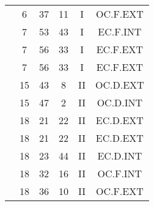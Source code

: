 \documentclass[12pt, a4paper]{article}
\begin{document}
\begin{multicols}{3}
{\begin{tabular}{c c c c c c}
	 	 	 	 & 6 & 37 & 11 & I & OC.F.EXT\\%
	 	 	 	 & 7 & 53 & 43 & I & EC.F.INT\\%
	 	 	 	 & 7 & 56 & 33 & I & EC.F.EXT\\%
	 	 	 	 & 7 & 56 & 33 & I & EC.F.EXT\\%
	 	 	 	 & 15 & 43 & 8 & II & OC.D.EXT\\%
	 	 	 	 & 15 & 47 & 2 & II & OC.D.INT\\%
	 	 	 	 & 18 & 21 & 22 & II & EC.D.EXT\\%
	 	 	 	 & 18 & 21 & 22 & II & EC.D.EXT\\%
	 	 	 	 & 18 & 23 & 44 & II & EC.D.INT\\%
	 	 	 	 & 18 & 32 & 16 & II & OC.F.INT\\%
	 	 	 	 & 18 & 36 & 10 & II & OC.F.EXT\\%
	 	 \end{tabular}
 	}
\end{multicols}
\end{document}

